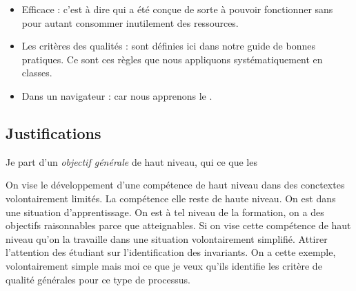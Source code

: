 \begin{itemize}
    \item Efficace : c'est à dire qui a été conçue de sorte à pouvoir fonctionner sans pour autant consommer inutilement des ressources.
    \item Les critères des qualités : sont définies ici dans notre guide de bonnes pratiques. Ce sont ces règles que nous appliquons systématiquement en classes.
    \item Dans un navigateur : car nous apprenons le .
\end{itemize}


\subsection{Justifications}
Je part d'un \emph{objectif générale} de haut niveau, qui ce que les

On vise le développement d'une compétence de haut niveau dans des conctextes volontairement limités. La compétence elle reste de haute niveau. On est dans une situation d'apprentissage. On est à tel niveau de la formation, on a des objectifs raisonnables parce que atteignables. Si on vise cette compétence de haut niveau qu'on la travaille dans une situation volontairement simplifié. Attirer l'attention des étudiant sur l'identification des invariants. On a cette exemple, volontairement simple mais moi ce que je veux qu'ils identifie les critère de qualité générales pour ce type de processus.

\clearpage
